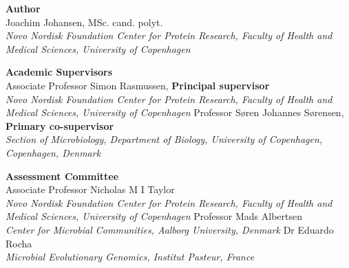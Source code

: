 \noindent
\textbf{Author}\\
\noindent Joachim Johansen, MSc. cand. polyt.\\
\textit{Novo Nordisk Foundation Center for Protein Research, Faculty of Health and Medical Sciences, University of Copenhagen}\\
\newline
\newline

\noindent \textbf{Academic Supervisors}\\
Associate Professor Simon Rasmussen, \textbf{Principal supervisor}\\
\textit{Novo Nordisk Foundation Center for Protein Research, Faculty of Health and Medical Sciences, University of Copenhagen}
\newline
\newline
Professor Søren Johannes Sørensen, \textbf{Primary co-supervisor}\\
\textit{Section of Microbiology, Department of Biology, University of Copenhagen, Copenhagen, Denmark}

\noindent \newline  \newline \textbf{Assessment Committee}\\
Associate Professor Nicholas M I Taylor\\
\textit{Novo Nordisk Foundation Center for Protein Research, Faculty of Health and Medical Sciences, University of Copenhagen}
\newline
\newline
Professor Mads Albertsen\\
\textit{Center for Microbial Communities, Aalborg University, Denmark}
\newline
\newline
Dr Eduardo Rocha\\
\textit{Microbial Evolutionary Genomics, Institut Pasteur, France}